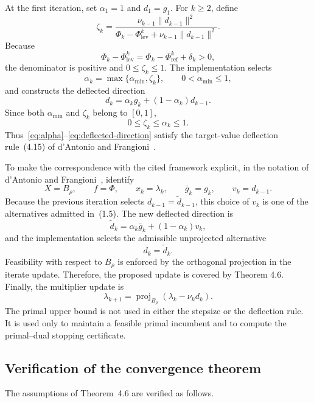 \documentclass[12pt]{article}
\DeclareMathOperator{\proj}{proj}
\begin{document}
At the first iteration, set $\alpha_1=1$ and $d_1=g_1$. For $k\ge2$, define
\begin{equation}
\zeta_k=
\frac{\nu_{k-1}\|d_{k-1}\|^2}
{\Phi_k-\Phi_{\mathrm{lev}}^k+\nu_{k-1}\|d_{k-1}\|^2}.
\label{eq:zeta}
\end{equation}
Because
\[
\Phi_k-\Phi_{\mathrm{lev}}^k
=\Phi_k-\Phi_{\mathrm{ref}}^k+\delta_k>0,
\]
the denominator is positive and $0\le\zeta_k\le1$. The implementation selects
\begin{equation}
\alpha_k=\max\{\alpha_{\min},\zeta_k\},
\qquad 0<\alpha_{\min}\le1,
\label{eq:alpha}
\end{equation}
and constructs the deflected direction
\begin{equation}
d_k=\alpha_kg_k+(1-\alpha_k)d_{k-1}.
\label{eq:deflected-direction}
\end{equation}
Since both $\alpha_{\min}$ and $\zeta_k$ belong to $[0,1]$,
\[
0\le\zeta_k\le\alpha_k\le1.
\]
Thus~\eqref{eq:alpha}--\eqref{eq:deflected-direction} satisfy the target-value deflection rule~(4.15) of d'Antonio and Frangioni~\cite[p.~381]{dantoniofrangioni}.

To make the correspondence with the cited framework explicit, in the notation of d'Antonio and Frangioni~\cite[eqs.~(1.2), (1.5), and (1.6), pp.~358--360]{dantoniofrangioni}, identify
\[
X=B_\rho,
\qquad
f=\Phi,
\qquad
x_k=\lambda_k,
\qquad
\bar g_k=g_k,
\qquad
v_k=d_{k-1}.
\]
Because the previous iteration selects $d_{k-1}=\widetilde d_{k-1}$, this choice of $v_k$ is one of the alternatives admitted in~(1.5). The new deflected direction is
\[
\widetilde d_k
=\alpha_k\bar g_k+(1-\alpha_k)v_k,
\]
and the implementation selects the admissible unprojected alternative
\[
d_k=\widetilde d_k.
\]
Feasibility with respect to $B_\rho$ is enforced by the orthogonal projection in the iterate update. Therefore, the proposed update is covered by Theorem 4.6.
Finally, the multiplier update is
\begin{equation}
\lambda_{k+1}
=\proj_{B_\rho}\left(\lambda_k-\nu_kd_k\right).
\label{eq:lambda-update}
\end{equation}
The primal upper bound is not used in either the stepsize or the deflection rule. It is used only to maintain a feasible primal incumbent and to compute the primal--dual stopping certificate.

\subsection{Verification of the convergence theorem}
The assumptions of Theorem~4.6 are verified as follows.
\end{document}
